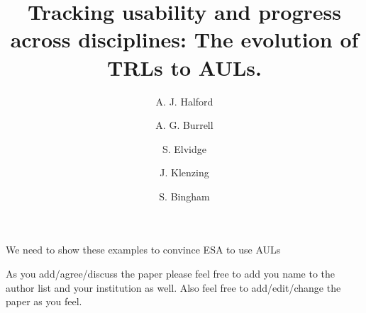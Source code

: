 \documentclass[referee,a4paper,12pt,traditabstract]{swsc}
\begin{document}
\begin{linenumbers}  

   \title{Tracking usability and progress across disciplines: The evolution of TRLs to AULs.}



   \author{A. J. Halford  \and A. G. Burrell  \and S. Elvidge  \and J. Klenzing  \and S. Bingham 
          }




  \abstract
   {We need to show these examples to convince ESA to use AULs}        %
   


   \maketitle


As you add/agree/discuss the paper please feel free to add you name to the author list and your institution as well. Also feel free to add/edit/change the paper as you feel. 


\end{linenumbers}
\end{document}
